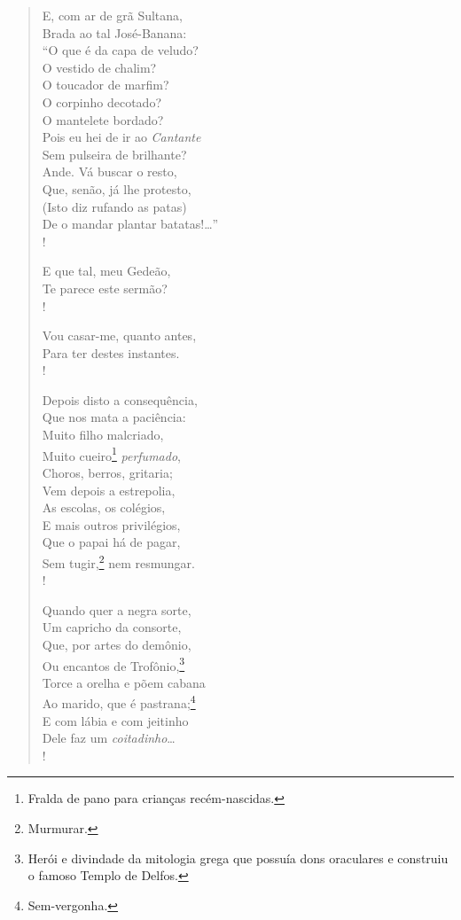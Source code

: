 \begin{verse}
E, com ar de grã Sultana,\\
Brada ao tal José-Banana:\\
``O que é da capa de veludo?\\
O vestido de chalim?\\
O toucador de marfim?\\
O corpinho decotado?\\
O mantelete bordado?\\
Pois eu hei de ir ao \emph{Cantante}\\
Sem pulseira de brilhante?\\
Ande. Vá buscar o resto,\\
Que, senão, já lhe protesto,\\
(Isto diz rufando as patas)\\
De o mandar plantar batatas!\ldots{}''\\!

E que tal, meu Gedeão,\\
Te parece este sermão?\\!

Vou casar-me, quanto antes,\\
Para ter destes instantes.\\!

Depois disto a consequência,\\
Que nos mata a paciência:\\
Muito filho malcriado,\\
Muito cueiro\footnote{ Fralda de pano para crianças recém-nascidas.} \emph{perfumado},\\
Choros, berros, gritaria;\\
Vem depois a estrepolia,\\
As escolas, os colégios,\\
E mais outros privilégios,\\
Que o papai há de pagar,\\
Sem tugir,\footnote{ Murmurar.} nem resmungar.\\!

Quando quer a negra sorte,\\
Um capricho da consorte,\\
Que, por artes do demônio,\\
Ou encantos de Trofônio,\footnote{ Herói e divindade da mitologia
                      grega que possuía dons oraculares e construiu o famoso Templo de
                      Delfos.}\\
Torce a orelha e põem cabana\\
Ao marido, que é pastrana;\footnote{ Sem-vergonha.}\\
E com lábia e com jeitinho\\
Dele faz um \emph{coitadinho}\ldots{}\\!


\end{verse}
